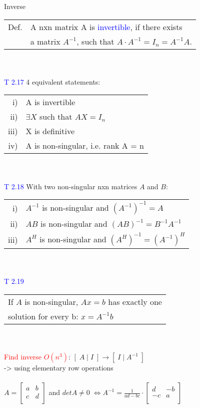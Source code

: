 \begin{mainbox}{Inverse}
\begin{tabular}{ll}
	Def. & A nxn matrix A is \textcolor{blue}{invertible}, if there exists\\
	& a matrix $A^{-1}$, such that $A\cdot A^{-1} = I_n = A^{-1}A$.\\
\end{tabular}\\
\smallskip\\
\textcolor{blue}{T 2.17} 4 equivalent statements:\\
\begin{tabular}{rl}
	i) & A is invertible\\
	ii) & $\exists X$ such that $AX = I_n$\\
	iii) & X is definitive\\
	iv) & A is non-singular, i.e. rank A = n\\
\end{tabular}\\
\smallskip\\
\textcolor{blue}{T 2.18} With two non-singular nxn matrices $A$ and $B$:
\begin{tabular}{rl}
	i) & $A^{-1}$ is non-singular and $(A^{-1})^{-1} = A$\\
	ii) & $AB$ is non-singular and $(AB)^{-1} = B^{-1}A^{-1}$\\
	iii) & $A^H$ is non-singular and $(A^H)^{-1} = (A^{-1})^H$\\
\end{tabular}\\
\smallskip\\
\textcolor{blue}{T 2.19}\\
\begin{tabular}{l}
	If $A$ is non-singular, $Ax = b$ has exactly one\\
	solution for every b: $x = A^{-1}b$\\
\end{tabular}\\
\smallskip\\
\textcolor{red}{Find inverse $O(n^3)$}: $[\;A\;|\;I\;]\longrightarrow[\;I\;|\;A^{-1}\;]$\\
-> using elementary row operations\\
\smallskip\\
$A = \begin{bmatrix}
a & b \\
c & d \\
\end{bmatrix}$ and $detA \neq 0\;\Leftrightarrow A^{-1}=\frac{1}{ad-bc}\cdot \begin{bmatrix}
d & -b \\
-c & a \\
\end{bmatrix}$
\end{mainbox}

